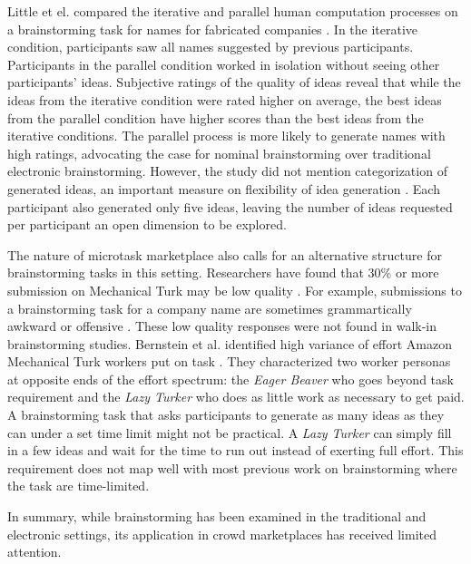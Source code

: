 Little et el. compared the iterative and parallel human computation processes on a brainstorming task for names for fabricated companies \cite{little2010exploring}. In the iterative condition, participants saw all names suggested by previous participants. Participants in the parallel condition worked in isolation without seeing other participants' ideas. Subjective ratings of the quality of ideas reveal that while the ideas from the iterative condition were rated higher on average, the best ideas from the parallel condition have higher scores than the best ideas from the iterative conditions. The parallel process is more likely to generate names with high ratings, advocating the case for nominal brainstorming over traditional electronic brainstorming. However, the study did not mention categorization of generated ideas, an important measure on flexibility of idea generation \cite{lewis2011affective, nijstad_how_2006, finke1992creative, shah2003metrics}. Each participant also generated only five ideas, leaving the number of ideas requested per participant an open dimension to be explored.

The nature of microtask marketplace also calls for an alternative structure for brainstorming tasks in this setting. Researchers have found that 30\% or more submission on Mechanical Turk may be low quality \cite{kittur2008crowdsourcing}. For example, submissions to a brainstorming task for a company name are sometimes grammartically awkward or offensive \cite{little2010exploring}. These low quality responses were not found in walk-in brainstorming studies. Bernstein et al. identified high variance of effort Amazon Mechanical Turk workers put on task \cite{soylent}. They characterized two worker personas at opposite ends of the effort spectrum: the {\em Eager Beaver\/} who goes beyond task requirement and the {\em Lazy Turker\/} who does as little work as necessary to get paid. A brainstorming task that asks participants to generate as many ideas as they can under a set time limit might not be practical. A {\em Lazy Turker\/} can simply fill in a few ideas and wait for the time to run out instead of exerting full effort. This requirement does not map well with most previous work on brainstorming where the task are time-limited. 



In summary, while brainstorming has been examined in the traditional and electronic settings, its application in crowd marketplaces has received limited attention. 